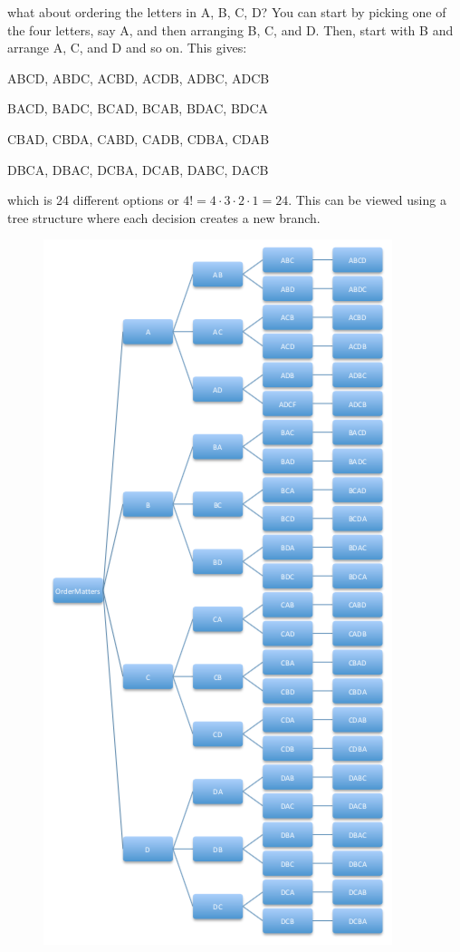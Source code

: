 \documentclass[10pt,]{book}
\numberwithin{equation}{section}
\begin{document}
what about ordering the letters in {A, B, C, D}? You can start by picking one of the four letters, say A, and then arranging B, C, and D.  Then, start with B and arrange A, C, and D and so on.  This gives:%
\par
\hypertarget{p-359}{}%
ABCD, ABDC, ACBD, ACDB, ADBC, ADCB%
\par
\hypertarget{p-360}{}%
BACD, BADC, BCAD, BCAB, BDAC, BDCA%
\par
\hypertarget{p-361}{}%
CBAD, CBDA, CABD, CADB, CDBA, CDAB%
\par
\hypertarget{p-362}{}%
DBCA, DBAC, DCBA, DCAB, DABC, DACB%
\par
\hypertarget{p-363}{}%
which is 24 different options or \(4! = 4 \cdot 3 \cdot 2 \cdot 1 = 24\).  This can be viewed using a tree structure where each decision creates a new branch. \begin{figure}\centering\includegraphics[width=1\linewidth]{images/PermutationAllTree.png}

\end{figure}
\end{document}
